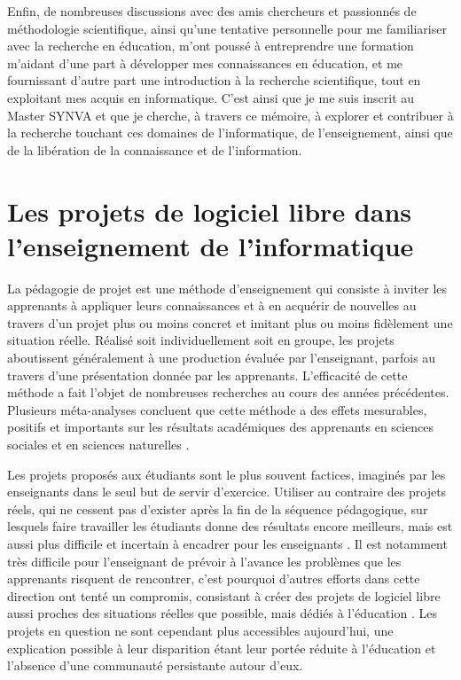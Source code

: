 Enfin, de nombreuses discussions avec des amis chercheurs et passionnés de méthodologie scientifique, ainsi
qu'une tentative personnelle pour me familiariser avec la recherche en éducation, m'ont poussé à entreprendre
une formation m'aidant d'une part à développer mes connaissances en éducation, et me fournissant d'autre part
une introduction à la recherche scientifique, tout en exploitant mes acquis en informatique. C'est ainsi que
je me suis inscrit au Master SYNVA et que je cherche, à travers ce mémoire, à explorer et contribuer à la
recherche touchant ces domaines de l'informatique, de l'enseignement, ainsi que de la libération de la
connaissance et de l'information.

\section{Les projets de logiciel libre dans l'enseignement de l'informatique}

La pédagogie de projet est une méthode d'enseignement qui consiste à inviter les apprenants à appliquer leurs
connaissances et à en acquérir de nouvelles au travers d'un projet plus ou moins concret et imitant plus ou
moins fidèlement une situation réelle. Réalisé soit individuellement soit en groupe, les projets aboutissent
généralement à une production évaluée par l'enseignant, parfois au travers d'une présentation donnée par les
apprenants. L'efficacité de cette méthode a fait l'objet de nombreuses recherches au cours des années
précédentes. Plusieurs méta-analyses concluent que cette méthode a des effets mesurables, positifs et
importants sur les résultats académiques des apprenants en sciences sociales et en sciences naturelles
.

Les projets proposés aux étudiants sont le plus souvent factices, imaginés par les enseignants dans le seul
but de servir d'exercice. Utiliser au contraire des projets réels, qui ne cessent pas d'exister après la fin
de la séquence pédagogique, sur lesquels faire travailler les étudiants donne des résultats encore meilleurs,
mais est aussi plus difficile et incertain à encadrer pour les enseignants . Il est notamment très difficile pour l'enseignant de prévoir à l'avance les problèmes que les
apprenants risquent de rencontrer, c'est pourquoi d'autres efforts dans cette direction ont tenté un
compromis, consistant à créer des projets de logiciel libre aussi proches des situations réelles que possible,
mais dédiés à l'éducation . Les projets en question ne sont cependant plus
accessibles aujourd'hui, une explication possible à leur disparition étant leur portée réduite à l'éducation
et l'absence d'une communauté persistante autour d'eux.


